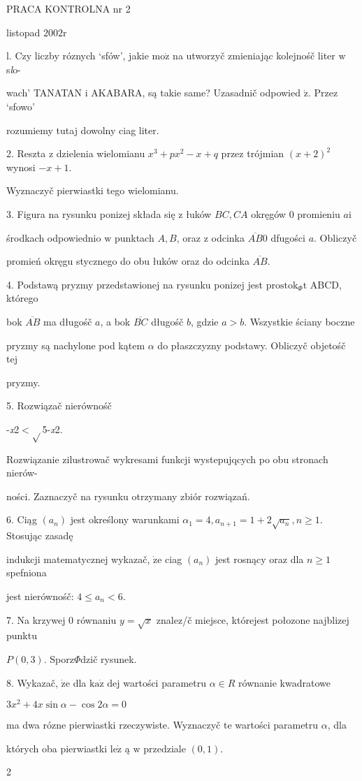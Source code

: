 \documentclass[a4paper,12pt]{article}
\begin{document}
PRACA KONTROLNA nr 2

listopad $2002\mathrm{r}$

l. Czy liczby róznych `sfów', jakie $\mathrm{m}\mathrm{o}\dot{\mathrm{z}}$ na utworzyč zmieniając kolejnośč liter $\mathrm{w}$ s{\it l}o-

wach' TANATAN $\mathrm{i}$ AKABARA, są takie same? Uzasadnič odpowied $\acute{\mathrm{z}}$. Przez `sfowo'

rozumiemy tutaj dowolny ciag liter.

2. Reszta $\mathrm{z}$ dzielenia wielomianu $x^{3}+px^{2}-x+q$ przez trójmian $(x+2)^{2}$ wynosi $-x+1.$

Wyznaczyč pierwiastki tego wielomianu.

3. Figura na rysunku ponizej składa się $\mathrm{z}$ łuków $BC, CA$ okręgów $0$ promieniu $a\mathrm{i}$

środkach odpowiednio $\mathrm{w}$ punktach $A, B$, oraz $\mathrm{z}$ odcinka $\overline{AB}0$ dfugości $a$. Obliczyč

promień okręgu stycznego do obu łuków oraz do odcinka $\overline{AB}.$

4. Podstawą pryzmy przedstawionej na rysunku ponizej jest $\mathrm{p}\mathrm{r}\mathrm{o}\mathrm{s}\mathrm{t}\mathrm{o}\mathrm{k}_{\Phi}\mathrm{t}$ ABCD, którego

bok $\overline{AB}$ ma długośč $a$, a bok $\overline{BC}$ długośč $b$, gdzie $a>b$. Wszystkie ściany boczne

pryzmy są nachylone pod kątem $\alpha$ do płaszczyzny podstawy. Obliczyč objetośč tej

pryzmy.

5. Rozwiązač nierównośč

-{\it x}2$<\sqrt{}$5-{\it x}2.

Rozwiązanie zilustrowač wykresami funkcji wystepujqcych po obu stronach nierów-

ności. Zaznaczyč na rysunku otrzymany zbiór rozwiązań.

6. Ciąg $(a_{n})$ jest określony warunkami $\alpha_{1}=4, a_{n+1}=1+2\sqrt{a_{n}}, n\geq 1$. Stosując zasadę

indukcji matematycznej wykazač, $\dot{\mathrm{z}}\mathrm{e}$ ciag $(a_{n})$ jest rosnący oraz dla $n\geq 1$ spefniona

jest nierównośč: $4\leq a_{n}<6.$

7. Na krzywej $0$ równaniu $y=\sqrt{x}$ znalez/č miejsce, którejest połozone najblizej punktu

$P(0,3)$. Sporz$\Phi$dzič rysunek.

8. Wykazač, $\dot{\mathrm{z}}\mathrm{e}$ dla $\mathrm{k}\mathrm{a}\dot{\mathrm{z}}$ dej wartości parametru $\alpha\in R$ równanie kwadratowe

$3x^{2}+4x\sin\alpha-\cos 2\alpha=0$

ma dwa rózne pierwiastki rzeczywiste. Wyznaczyč te wartości parametru $\alpha$, dla

których oba pierwiastki $\mathrm{l}\mathrm{e}\dot{\mathrm{z}}$ ą $\mathrm{w}$ przedziale $(0,1).$

2
\end{document}
